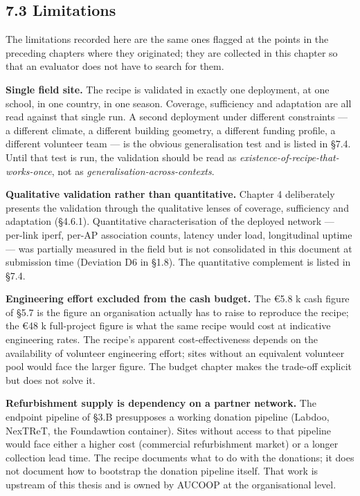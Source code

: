 \hypertarget{limitations}{%
\subsection{7.3 Limitations}\label{limitations}}

The limitations recorded here are the same ones flagged at the points in
the preceding chapters where they originated; they are collected in this
chapter so that an evaluator does not have to search for them.

\textbf{Single field site.} The recipe is validated in exactly one
deployment, at one school, in one country, in one season. Coverage,
sufficiency and adaptation are all read against that single run. A
second deployment under different constraints --- a different climate, a
different building geometry, a different funding profile, a different
volunteer team --- is the obvious generalisation test and is listed in
§7.4. Until that test is run, the validation should be read as
\emph{existence-of-recipe-that-works-once}, not as
\emph{generalisation-across-contexts}.

\textbf{Qualitative validation rather than quantitative.} Chapter 4
deliberately presents the validation through the qualitative lenses of
coverage, sufficiency and adaptation (§4.6.1). Quantitative
characterisation of the deployed network --- per-link iperf, per-AP
association counts, latency under load, longitudinal uptime --- was
partially measured in the field but is not consolidated in this document
at submission time (Deviation D6 in §1.8). The quantitative complement
is listed in §7.4.

\textbf{Engineering effort excluded from the cash budget.} The €5.8 k
cash figure of §5.7 is the figure an organisation actually has to raise
to reproduce the recipe; the €48 k full-project figure is what the same
recipe would cost at indicative engineering rates. The recipe's apparent
cost-effectiveness depends on the availability of volunteer engineering
effort; sites without an equivalent volunteer pool would face the larger
figure. The budget chapter makes the trade-off explicit but does not
solve it.

\textbf{Refurbishment supply is dependency on a partner network.} The
endpoint pipeline of §3.B presupposes a working donation pipeline
(Labdoo, NexTReT, the Foundawtion container). Sites without access to
that pipeline would face either a higher cost (commercial refurbishment
market) or a longer collection lead time. The recipe documents what to
do with the donations; it does not document how to bootstrap the
donation pipeline itself. That work is upstream of this thesis and is
owned by AUCOOP at the organisational level.

